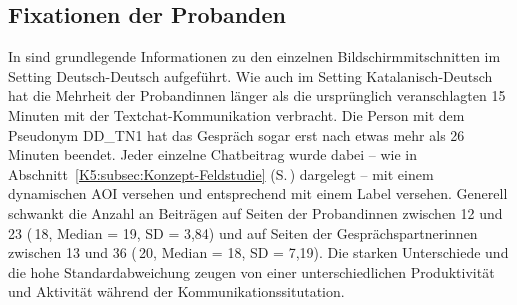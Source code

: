 \subsection{Fixationen der Probanden}

\label{K6:sub:FixationenDeDe}

In  sind grundlegende Informationen zu den einzelnen Bildschirmmitschnitten im Setting Deutsch-Deutsch aufgeführt. Wie auch im Setting Ka\-ta\-la\-nisch-Deutsch hat die Mehrheit der Proband{\textperiodcentered}innen länger als die ursprünglich veranschlagten 15 Minuten mit der Textchat-{K}ommunikation verbracht. Die Person mit dem Pseudonym DD\_TN1 hat das Gespräch sogar erst nach etwas mehr als 26 Minuten beendet. Jeder einzelne Chatbeitrag wurde dabei -- wie in Abschnitt~\ref{K5:subsec:Konzept-Feldstudie} (S.\,\pageref{K5:subsec:Konzept-Feldstudie}) dargelegt -- mit einem dynamischen AOI versehen und entsprechend mit einem Label versehen. Generell schwankt die Anzahl an Beiträgen auf Seiten der Proband{\textperiodcentered}innen zwischen 12 und 23 (\diameter\,18, Median = 19, SD = 3,84) und auf Seiten der Gesprächspartner{\textperiodcentered}innen zwischen 13 und 36 (\diameter\,20, Median = 18, SD = 7,19). Die starken Unterschiede und die hohe Standardabweichung zeugen von einer unterschiedlichen Produktivität und Aktivität während der Kommunikationssitutation.



